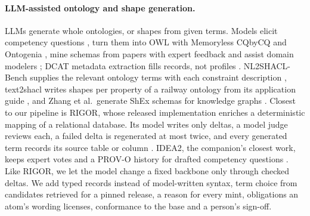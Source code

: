 \paragraph{\acs{LLM}-assisted ontology and shape generation.}
\acp{LLM} generate whole ontologies, or shapes from given terms.
Models elicit competency questions \cite{zhang2024ontochat,lippolis2025bench4ke}, turn them into \ac{OWL} with
Memoryless CQbyCQ and Ontogenia \cite{lippolis2025ontology}, mine schemas from papers with expert feedback
\cite{sadruddin2025schema} and assist domain modelers \cite{prokop2024assistant}; \ac{DCAT} metadata extraction
fills records, not profiles \cite{busch2025dcat}.
NL2SHACL-Bench supplies the relevant ontology terms with each constraint description \cite{zhou2026nl2shacl},
text2shacl writes shapes per property of a railway ontology from its application guide
\cite{martinez2026text2shacl}, and Zhang et al.\ generate ShEx schemas for knowledge graphs \cite{zhang2025schema}.
Closest to our pipeline is RIGOR, whose released implementation enriches a deterministic mapping of a relational
database. Its model writes only deltas, a model judge reviews each, a failed delta is regenerated at most twice, %
and every generated term records its source table or column \cite{fathallah2026rigor}.
IDEA2, the companion's closest work, keeps expert votes and a PROV-O history for drafted competency questions
\cite{alharbi2027idea2}.
Like RIGOR, we let the model change a fixed backbone only through checked deltas. We add typed records instead
of model-written syntax, term choice from candidates retrieved for a pinned release, a reason for every
mint, obligations an atom's wording licenses, conformance to the base and a person's sign-off.

